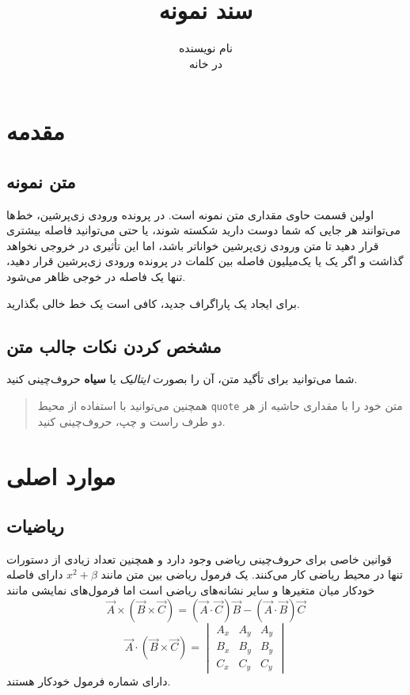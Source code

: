 \documentclass[a4paper,12pt]{article}
\title{سند نمونه}
\author{نام نویسنده\\
        در خانه}
\begin{document}
\maketitle

\section{مقدمه}

\subsection{متن نمونه}
اولین قسمت حاوی مقداری متن نمونه است.
در پرونده ورودی زی‌پرشین، خط‌ها می‌توانند هر جایی که شما دوست دارید شکسته شوند،
یا حتی می‌توانید فاصله بیشتری قرار دهید تا متن ورودی زی‌پرشین خواناتر باشد،
اما این تأثیری در خروجی نخواهد گذاشت و اگر یک یا یک‌میلیون فاصله بین کلمات در پرونده ورودی زی‌پرشین قرار دهید،
 تنها یک فاصله در خوجی ظاهر می‌شود.

برای ایجاد یک پاراگراف جدید، کافی است یک خط خالی بگذارید.

\subsection{مشخص کردن نکات جالب متن}

شما می‌توانید برای تأگید متن، آن را بصورت
\emph{ایتالیک} 
یا
 \textbf{سیاه}
حروف‌چینی کنید.

\begin{quote}
همچنین می‌توانید با استفاده از محیط
\texttt{quote}
متن خود را با مقداری حاشیه از هر دو طرف راست و چپ، حروف‌چینی کنید.
\end{quote}

\section{موارد اصلی}

\subsection{ریاضیات}

قوانین خاصی برای حروف‌چینی ریاضی وجود دارد و همچنین تعداد زیادی از دستورات تنها در محیط ریاضی کار می‌کنند.
یک فرمول ریاضی بین متن مانند
$x^2+\beta$ 
دارای فاصله خودکار میان متغیرها و سایر نشانه‌های ریاضی است اما فرمول‌های نمایشی مانند 
\begin{equation}
  \vec{A} \times (\vec{B}\times\vec{C}) =
  (\vec{A}\cdot\vec{C})\vec{B} -
  (\vec{A}\cdot\vec{B})\vec{C}
\end{equation}
\begin{equation}
  \vec{A}\cdot(\vec{B}\times\vec{C}) =
  \begin{vmatrix}
    A_x & A_y & A_y \\
    B_x & B_y & B_y \\
    C_x & C_y & C_y
  \end{vmatrix}
\end{equation}
دارای شماره فرمول خودکار هستند.
\end{document}
